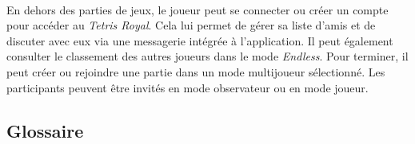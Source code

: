 \documentclass{article}
\begin{document}
\paragraph*{}

En dehors des parties de jeux, le joueur peut se connecter ou créer un compte pour accéder au \textit{Tetris Royal}. Cela lui permet de gérer sa liste d'amis et de discuter avec eux via une messagerie intégrée à l'application. Il peut également consulter le classement des autres joueurs dans le mode \textit{Endless}. Pour terminer, il peut créer ou rejoindre une partie dans un mode multijoueur sélectionné. Les participants peuvent être invités en mode observateur ou en mode joueur.

\newpage

\subsection{Glossaire}
\end{document}
